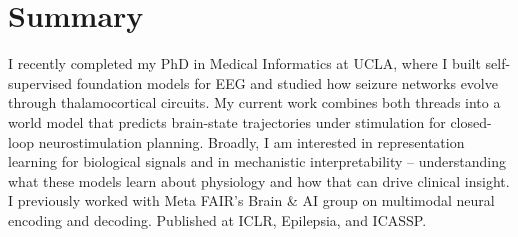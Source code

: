 \section*{Summary}

I recently completed my PhD in Medical Informatics at UCLA, where I built self-supervised foundation models for EEG and studied how seizure networks evolve through thalamocortical circuits. My current work combines both threads into a world model that predicts brain-state trajectories under stimulation for closed-loop neurostimulation planning. Broadly, I am interested in representation learning for biological signals and in mechanistic interpretability -- understanding what these models learn about physiology and how that can drive clinical insight. I previously worked with Meta FAIR's Brain \& AI group on multimodal neural encoding and decoding. Published at ICLR, Epilepsia, and ICASSP.
